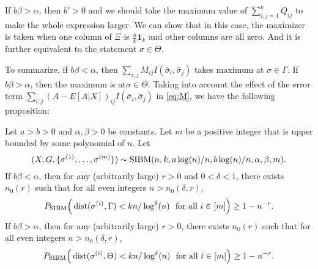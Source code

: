 \documentclass{article}
\begin{document}
If $b\beta>\alpha$, then $b' > 0$ and we should take the maximum value of $\sum_{i,j=1}^k Q_{ij}$ to make the whole expression larger. We can show that in this case, the maximizer is taken when one column of $\Xi$ is $\frac{n}{k}  \mathbf{1}_k$ and other columns are all zero. And it is further equivalent to the statement $\sigma \in \Theta$.

To summarize, if $b\beta<\alpha$, then $\sum_{i,j} M_{ij} I(\bar{\sigma}_i, \bar{\sigma}_j)$ takes maximum at $\sigma \in \Gamma$.
If $b\beta>\alpha$, then the maximum is at$\sigma \in \Theta$.
Taking into account the effect of the error term $ \sum_{i,j}  (A-E[A|X])_{ij}
 I(\bar{\sigma}_i, \bar{\sigma}_j)  $ in \eqref{eq:M}, we have the following proposition:

\begin{proposition} \label{prop:1}
Let $a>b>0$ and $\alpha,\beta>0$ be constants. Let $m$ be a positive integer that is upper bounded by some polynomial of $n$.
Let 
$$
(X,G,\{\sigma^{(1)},\dots,\sigma^{(m)}\})\sim \operatorname{SIBM}(n,k, a\log(n)/n, b\log(n)/n, \alpha,\beta, m) .
$$
If $b\beta <\alpha$, then for any (arbitrarily large) $r>0$ and $0 < \delta < 1$, there exists $n_0(r)$ such that for all even integers $n>n_0(\delta, r)$,
$$
P_{\operatorname{SIBM}} \Big(\operatorname{dist}(\sigma^{(i)}, \Gamma)< kn/\log^{\delta}(n)
\text{~~for all~} i\in[m] \Big) \ge 1- n^{-r} .
$$
If $b\beta >\alpha$, then for any (arbitrarily large) $r>0$, there exists $n_0(r)$ such that for all even integers $n>n_0(\delta, r)$,
$$
P_{\operatorname{SIBM}} \Big(\operatorname{dist}(\sigma^{(i)}, \Theta)< kn/\log^{\delta}(n)
\text{~~for all~} i\in[m] \Big) \ge 1- n^{-r} .
$$
\end{proposition}
\end{document}
